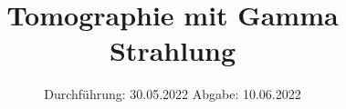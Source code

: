 

\subject{Versuch Nr.V14}
\title{Tomographie mit Gamma Strahlung}
\date{%
  Durchführung: 30.05.2022
  \hspace{3em}
  Abgabe: 10.06.2022
}



\maketitle
\thispagestyle{empty}
\tableofcontents
\newpage 








\nocite{*}

\printbibliography{}


